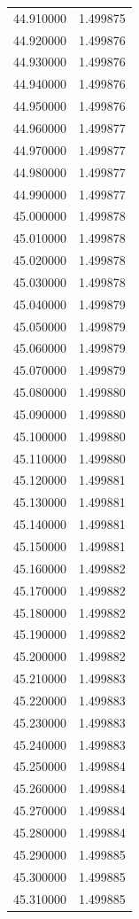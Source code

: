\begin{tabular}{rr}
44.910000 & 1.499875 \\
44.920000 & 1.499876 \\
44.930000 & 1.499876 \\
44.940000 & 1.499876 \\
44.950000 & 1.499876 \\
44.960000 & 1.499877 \\
44.970000 & 1.499877 \\
44.980000 & 1.499877 \\
44.990000 & 1.499877 \\
45.000000 & 1.499878 \\
45.010000 & 1.499878 \\
45.020000 & 1.499878 \\
45.030000 & 1.499878 \\
45.040000 & 1.499879 \\
45.050000 & 1.499879 \\
45.060000 & 1.499879 \\
45.070000 & 1.499879 \\
45.080000 & 1.499880 \\
45.090000 & 1.499880 \\
45.100000 & 1.499880 \\
45.110000 & 1.499880 \\
45.120000 & 1.499881 \\
45.130000 & 1.499881 \\
45.140000 & 1.499881 \\
45.150000 & 1.499881 \\
45.160000 & 1.499882 \\
45.170000 & 1.499882 \\
45.180000 & 1.499882 \\
45.190000 & 1.499882 \\
45.200000 & 1.499882 \\
45.210000 & 1.499883 \\
45.220000 & 1.499883 \\
45.230000 & 1.499883 \\
45.240000 & 1.499883 \\
45.250000 & 1.499884 \\
45.260000 & 1.499884 \\
45.270000 & 1.499884 \\
45.280000 & 1.499884 \\
45.290000 & 1.499885 \\
45.300000 & 1.499885 \\
45.310000 & 1.499885 \\

\end{tabular}
